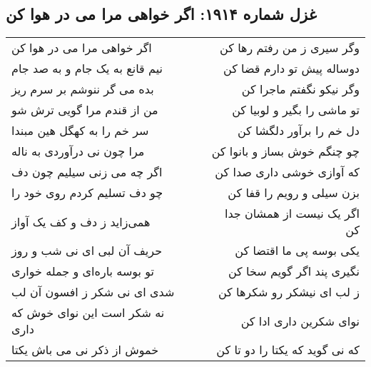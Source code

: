 \begin{center}
\section*{غزل شماره ۱۹۱۴: اگر خواهی مرا می در هوا کن}
\label{sec:1914}
\begin{longtable}{l p{0.5cm} r}
اگر خواهی مرا می در هوا کن
&&
وگر سیری ز من رفتم رها کن
\\
نیم قانع به یک جام و به صد جام
&&
دوساله پیش تو دارم قضا کن
\\
بده می گر ننوشم بر سرم ریز
&&
وگر نیکو نگفتم ماجرا کن
\\
من از قندم مرا گویی ترش شو
&&
تو ماشی را بگیر و لوبیا کن
\\
سر خم را به کهگل هین مبندا
&&
دل خم را برآور دلگشا کن
\\
مرا چون نی درآوردی به ناله
&&
چو چنگم خوش بساز و بانوا کن
\\
اگر چه می زنی سیلیم چون دف
&&
که آوازی خوشی داری صدا کن
\\
چو دف تسلیم کردم روی خود را
&&
بزن سیلی و رویم را قفا کن
\\
همی‌زاید ز دف و کف یک آواز
&&
اگر یک نیست از همشان جدا کن
\\
حریف آن لبی ای نی شب و روز
&&
یکی بوسه پی ما اقتضا کن
\\
تو بوسه باره‌ای و جمله خواری
&&
نگیری پند اگر گویم سخا کن
\\
شدی ای نی شکر ز افسون آن لب
&&
ز لب ای نیشکر رو شکرها کن
\\
نه شکر است این نوای خوش که داری
&&
نوای شکرین داری ادا کن
\\
خموش از ذکر نی می باش یکتا
&&
که نی گوید که یکتا را دو تا کن
\\
\end{longtable}
\end{center}
